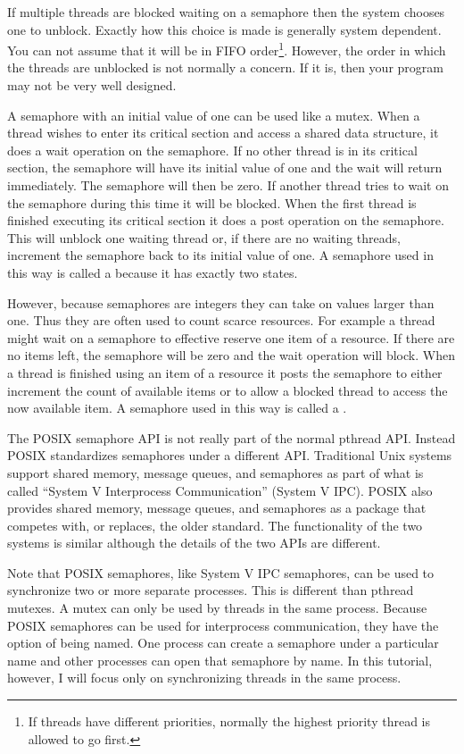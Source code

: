 If multiple threads are blocked waiting on a semaphore then the system chooses one to unblock.
Exactly how this choice is made is generally system dependent. You can not assume that it will
be in FIFO order\footnote{If threads have different priorities, normally the highest priority
  thread is allowed to go first.}. However, the order in which the threads are unblocked is not
normally a concern. If it is, then your program may not be very well designed.

A semaphore with an initial value of one can be used like a mutex. When a thread wishes to enter
its critical section and access a shared data structure, it does a wait operation on the
semaphore. If no other thread is in its critical section, the semaphore will have its initial
value of one and the wait will return immediately. The semaphore will then be zero. If another
thread tries to wait on the semaphore during this time it will be blocked. When the first thread
is finished executing its critical section it does a post operation on the semaphore. This will
unblock one waiting thread or, if there are no waiting threads, increment the semaphore back to
its initial value of one. A semaphore used in this way is called a 
because it has exactly two states.

However, because semaphores are integers they can take on values larger than one. Thus they are
often used to count scarce resources. For example a thread might wait on a semaphore to
effective reserve one item of a resource. If there are no items left, the semaphore will be zero
and the wait operation will block. When a thread is finished using an item of a resource it
posts the semaphore to either increment the count of available items or to allow a blocked
thread to access the now available item. A semaphore used in this way is called a
.

The POSIX semaphore API is not really part of the normal pthread API. Instead POSIX standardizes
semaphores under a different API. Traditional Unix systems support shared memory, message
queues, and semaphores as part of what is called ``System V Interprocess Communication'' (System
V IPC). POSIX also provides shared memory, message queues, and semaphores as a package that
competes with, or replaces, the older standard. The functionality of the two systems is similar
although the details of the two APIs are different.

Note that POSIX semaphores, like System V IPC semaphores, can be used to synchronize two or more
separate processes. This is different than pthread mutexes. A mutex can only be used by threads
in the same process. Because POSIX semaphores can be used for interprocess communication, they
have the option of being named. One process can create a semaphore under a particular name and
other processes can open that semaphore by name. In this tutorial, however, I will focus only on
synchronizing threads in the same process.

